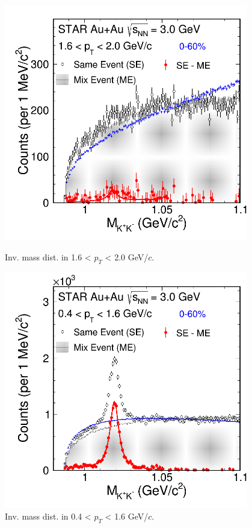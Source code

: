 \begin{figure}[htbp]
\begin{minipage}[htbp]{0.45\linewidth}
\centering
\includegraphics[width=0.95\textwidth]{chapterY/fig/fig1_signal_0_8.png}
\caption{Inv. mass dist. in 1.6 < $p_T$ < 2.0 GeV/$c$. \label{fig:mixedEvent_pT8}}
\end{minipage}
\hfill
\begin{minipage}[htbp]{0.45\linewidth}
\centering
\includegraphics[width=0.95\textwidth]{chapterY/fig/fig1_signal_0_9.png} 
\caption{Inv. mass dist. in 0.4 < $p_T$ < 1.6 GeV/$c$. \label{fig:mixedEvent_pT9}}
\end{minipage}
\end{figure}

